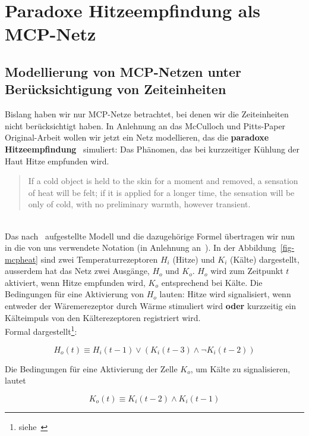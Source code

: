 \chapter{Paradoxe Hitzeempfindung als MCP-Netz}\label{appendix:paradoxehitzeempfindung}
\section*{Modellierung von MCP-Netzen unter Berücksichtigung von Zeiteinheiten}

Bislang haben wir nur MCP-Netze betrachtet, bei denen wir die Zeiteinheiten nicht berücksichtigt haben. In Anlehnung an das McCulloch und Pitts-Paper Original-Arbeit wollen wir jetzt ein Netz modellieren, das die \textbf{paradoxe Hitzeempfindung}~\cite{HVKJ82} simuliert: Das Phänomen, das bei kurzzeitiger Kühlung der Haut Hitze empfunden wird.\\

\blockquote[{\cite[106]{MP43}}]{
    If a cold object is held to the skin for a moment and removed, a sensation of heat will be felt; if it is applied for a longer time, the sensation will be only of cold, with no preliminary warmth, however transient.
}\\

Das nach~\cite[105, Figure 1 (e)]{MP43} aufgestellte Modell und die dazugehörige Formel übertragen wir nun in die von uns verwendete Notation (in Anlehnung an~\cite[31 f.]{Fau94}). In der Abbildung~\ref{fig-mcpheat} sind zwei Temperaturrezeptoren $H_i$ (Hitze) und $K_i$ (Kälte) dargestellt, ausserdem hat das Netz zwei Ausgänge, $H_o$ und $K_o$. $H_o$ wird zum Zeitpunkt $t$ aktiviert, wenn Hitze empfunden wird, $K_o$ entsprechend bei Kälte.
\noindent
Die Bedingungen für eine Aktivierung von $H_o$ lauten: Hitze wird signalisiert, wenn entweder der Wäremerezeptor durch Wärme stimuliert wird \textbf{oder} kurzzeitig ein Kälteimpuls von den Kälterezeptoren registriert wird.\\

Formal dargestellt\footnote{
    siehe~\cite[106]{MP43}
}:

\begin{equation}
    H_o(t) \equiv H_i(t-1) \lor (K_i(t-3) \land \neg K_i(t - 2))
    \label{eq:gl-heat}
\end{equation}

Die Bedingungen für eine Aktivierung der Zelle $K_o$, um Kälte zu signalisieren, lautet


\begin{equation}
    K_o(t) \equiv K_i(t-2) \land K_i(t-1)
    \label{eq:gl-cold}
\end{equation}


